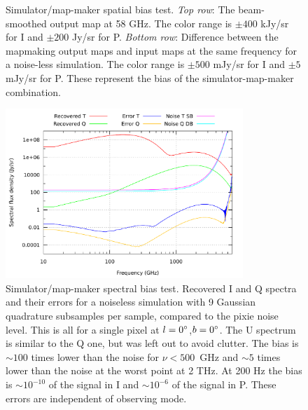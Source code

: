\documentclass{article}
\begin{document}
\begin{figure}
\begin{tabular}{rm{56mm}m{54.4mm}m{56mm}}
	\end{tabular}
	\caption{Simulator/map-maker spatial bias test.
		\emph{Top row}: The beam-smoothed output map at 58 GHz.
			The color range is $\pm 400$ kJy/sr for I and $\pm 200$ Jy/sr for P.
		\emph{Bottom row}: Difference between the mapmaking output maps and
			input maps at the same frequency for a noise-less simulation.
			The color range is $\pm 500$ mJy/sr for I and $\pm 5$ mJy/sr for P.
			These represent the bias of the simulator-map-maker combination.}
	\label{fig:spatbias}
\end{figure}

\begin{figure}
	\centering
	\includegraphics[width=0.8\textwidth]{plots/error_std_sb_abs_log_log.pdf}
	\caption{Simulator/map-maker spectral bias test. Recovered I and Q spectra and
	their errors for a noiseless simulation
	with 9 Gaussian quadrature subsamples per sample, compared to the pixie
	noise level. This is all for a single pixel at $l=0\degree$,$b=0\degree$.
	The U spectrum is similar to the Q one, but was left out to avoid clutter.
	The bias is $\sim 100$ times lower than the noise for $\nu<500$~GHz and
	$\sim 5$ times lower than the noise at the worst point at 2 THz. At 200
	Hz the bias is $\sim 10^{-10}$ of the signal in I and $\sim 10^{-6}$
	of the signal in P. These errors are independent of observing mode.}
	\label{fig:specbias}
\end{figure}
\end{document}
